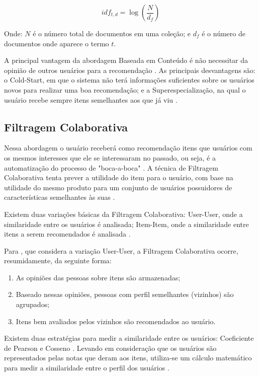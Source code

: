 \begin{equation}
  idf_{t,d} = \log(\frac{N}{d_f})
  \label{eq:idf}
\end{equation}

Onde: $N$ é o número total de documentos em uma coleção; e $d_f$ é o número de documentos onde aparece o termo $t$.

A principal vantagem da abordagem Baseada em Conteúdo é não necessitar da opinião de outros usuários para a recomendação
\cite{ricci2011introduction}. As principais desvantagens são: o Cold-Start, em que o sistema não terá informações
suficientes sobre os usuários novos para realizar uma boa recomendação; e a Superespecialização, na qual o
usuário recebe sempre itens semelhantes aos que já viu \cite{lops2011content}.

\subsection{Filtragem Colaborativa}

Nessa abordagem o usuário receberá como recomendação itens que usuários com os mesmos interesses que ele se
interessaram no passado, ou seja, é a automatização do processo de "boca-a-boca" \cite{jannach2010recommender}. A
técnica de Filtragem Colaborativa tenta prever a utilidade  do item para o usuário, com base na utilidade do mesmo
produto para um conjunto de usuários  possuidores de características semelhantes às suas \cite{jannach2010recommender}.

Existem duas variações básicas da Filtragem Colaborativa: User-User, onde a similaridade entre os usuários é analisada;
Item-Item, onde a similaridade entre itens a serem recomendados é analisada \cite{jannach2010recommender}.

Para , que considera a variação User-User, a Filtragem Colaborativa ocorre,
resumidamente, da seguinte forma:

\begin{enumerate}
\item As opiniões das pessoas sobre itens são armazenadas;
\item Baseado nessas opiniões, pessoas com perfil semelhantes (vizinhos) são agrupados;
\item Itens bem avaliados pelos vizinhos são recomendados ao usuário.
\end{enumerate}

Existem duas estratégias para medir a similaridade entre os usuários: Coeficiente de Pearson e Cosseno
\cite{torres2004personalizaccao}. Levando em consideração que os usuários são representados pelas notas que deram aos
itens, utiliza-se um cálculo matemático para medir a similaridade entre o perfil dos usuários
\cite{torres2004personalizaccao}.

